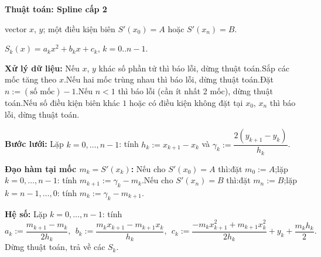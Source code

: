 \documentclass[11pt,a4paper]{article}
\newenvironment{thuattoan}[1]
  {\par\medskip\noindent\textbf{Thuật toán: #1}\begin{description}[style=standard,align=left,leftmargin=4.3em,labelwidth=3.9em,labelsep=0.4em,itemsep=1pt,topsep=3pt,font=\normalfont\bfseries]}
  {\end{description}}
\newcommand{\thut}{\newline\hspace*{1.2em}}
\begin{document}
\begin{thuattoan}{Spline cấp 2}
\item[Input:] vector $x$, $y$; một điều kiện biên $S'(x_0)=A$ hoặc $S'(x_n)=B$.
\item[Output:] $S_k(x)=a_kx^2+b_kx+c_k$, $k=0..n-1$.
\item[Bước 0:] \textbf{Xử lý dữ liệu:} Nếu $x$, $y$ khác số phần tử thì báo lỗi, dừng thuật toán.\newline Sắp các mốc tăng theo $x$.\newline Nếu hai mốc trùng nhau thì báo lỗi, dừng thuật toán.\newline Đặt $n:=(\text{số mốc})-1$.\newline Nếu $n<1$ thì báo lỗi (cần ít nhất 2 mốc), dừng thuật toán.\newline Nếu số điều kiện biên khác $1$ hoặc có điều kiện không đặt tại $x_0$, $x_n$ thì báo lỗi, dừng thuật toán.
\item[Bước 1:] \textbf{Bước lưới:} Lặp $k=0,\dots,n-1$: tính $h_k:=x_{k+1}-x_k$ và $\gamma_k:=\dfrac{2(y_{k+1}-y_k)}{h_k}$.
\item[Bước 2:] \textbf{Đạo hàm tại mốc $m_k=S'(x_k)$:} Nếu cho $S'(x_0)=A$ thì:\thut đặt $m_0:=A$;\thut lặp $k=0,\dots,n-1$: tính $m_{k+1}:=\gamma_k-m_k$.\newline Nếu cho $S'(x_n)=B$ thì:\thut đặt $m_n:=B$;\thut lặp $k=n-1,\dots,0$: tính $m_k:=\gamma_k-m_{k+1}$.
\item[Bước 3:] \textbf{Hệ số:} Lặp $k=0,\dots,n-1$: tính
  \[ a_k:=\frac{m_{k+1}-m_k}{2h_k},\ \ b_k:=\frac{m_kx_{k+1}-m_{k+1}x_k}{h_k},\ \ c_k:=\frac{-m_kx_{k+1}^2+m_{k+1}x_k^2}{2h_k}+y_k+\frac{m_kh_k}{2}. \]
  Dừng thuật toán, trả về các $S_k$.
\end{thuattoan}
\end{document}
